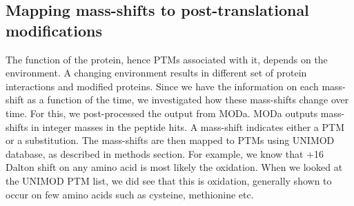 \documentclass[12pt]{article}
\begin{document}
\subsection{Mapping mass-shifts to post-translational modifications}

The function of the protein, hence PTMs associated with it, depends on the environment. A changing environment results in different set of protein interactions and modified proteins. Since we have the information on each mass-shift as a function of the time, we investigated how these mass-shifts change over time. For this, we post-processed the output from MODa. MODa outputs mass-shifts in integer masses in the peptide hits. A mass-shift indicates either a PTM or a substitution. The mass-shifts are then mapped to PTMs using UNIMOD database, as described in methods section. For example, we know that +16 Dalton shift on any amino acid is most likely the oxidation. When we looked at the UNIMOD PTM list, we did see that this is oxidation, generally shown to occur on few amino acids such as cysteine, methionine etc.
\end{document}
